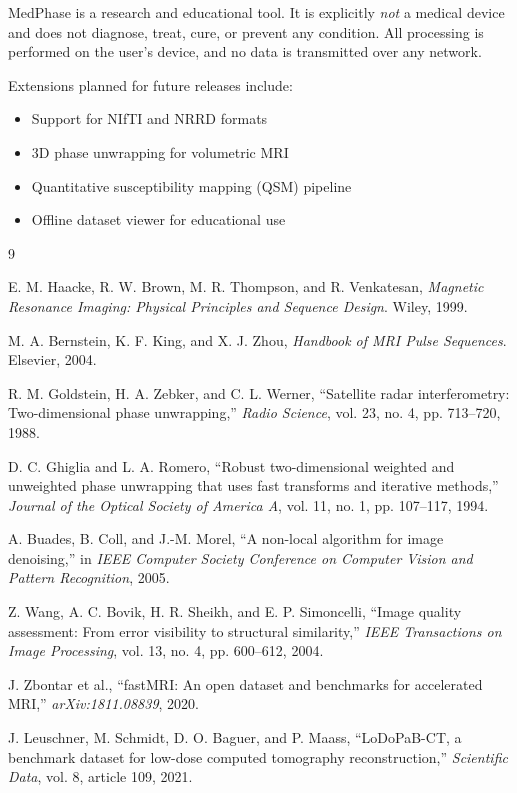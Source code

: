 \documentclass[11pt,a4paper]{article}
\begin{document}
MedPhase is a research and educational tool. It is explicitly \emph{not} a medical device and does not diagnose, treat, cure, or prevent any condition. All processing is performed on the user's device, and no data is transmitted over any network.

Extensions planned for future releases include:
\begin{itemize}
\item Support for NIfTI and NRRD formats
\item 3D phase unwrapping for volumetric MRI
\item Quantitative susceptibility mapping (QSM) pipeline
\item Offline dataset viewer for educational use
\end{itemize}

\begin{thebibliography}{9}

E. M. Haacke, R. W. Brown, M. R. Thompson, and R. Venkatesan, \emph{Magnetic Resonance Imaging: Physical Principles and Sequence Design}. Wiley, 1999.

M. A. Bernstein, K. F. King, and X. J. Zhou, \emph{Handbook of MRI Pulse Sequences}. Elsevier, 2004.

R. M. Goldstein, H. A. Zebker, and C. L. Werner, ``Satellite radar interferometry: Two-dimensional phase unwrapping,'' \emph{Radio Science}, vol. 23, no. 4, pp. 713--720, 1988.

D. C. Ghiglia and L. A. Romero, ``Robust two-dimensional weighted and unweighted phase unwrapping that uses fast transforms and iterative methods,'' \emph{Journal of the Optical Society of America A}, vol. 11, no. 1, pp. 107--117, 1994.

A. Buades, B. Coll, and J.-M. Morel, ``A non-local algorithm for image denoising,'' in \emph{IEEE Computer Society Conference on Computer Vision and Pattern Recognition}, 2005.

Z. Wang, A. C. Bovik, H. R. Sheikh, and E. P. Simoncelli, ``Image quality assessment: From error visibility to structural similarity,'' \emph{IEEE Transactions on Image Processing}, vol. 13, no. 4, pp. 600--612, 2004.

J. Zbontar et al., ``fastMRI: An open dataset and benchmarks for accelerated MRI,'' \emph{arXiv:1811.08839}, 2020.

J. Leuschner, M. Schmidt, D. O. Baguer, and P. Maass, ``LoDoPaB-CT, a benchmark dataset for low-dose computed tomography reconstruction,'' \emph{Scientific Data}, vol. 8, article 109, 2021.

\end{thebibliography}
\end{document}
